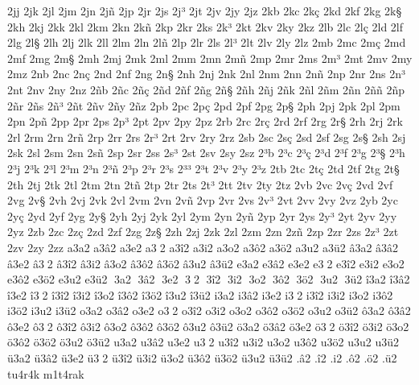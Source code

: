 {2jj
2jk
2jl
2jm
2jn
2j^^f1
2jp
2jr
2js
2j^^b3
2jt
2jv
2jy
2jz
2kb
2kc
2k^^e7
2kd
2kf
2kg
2k^^a7
2kh
2kj
2kk
2kl
2km
2kn
2k^^f1
2kp
2kr
2ks
2k^^b3
2kt
2kv
2ky
2kz
2lb
2lc
2l^^e7
2ld
2lf
2lg
2l^^a7
2lh
2lj
2lk
2ll
2lm
2ln
2l^^f1
2lp
2lr
2ls
2l^^b3
2lt
2lv
2ly
2lz
2mb
2mc
2m^^e7
2md
2mf
2mg
2m^^a7
2mh
2mj
2mk
2ml
2mm
2mn
2m^^f1
2mp
2mr
2ms
2m^^b3
2mt
2mv
2my
2mz
2nb
2nc
2n^^e7
2nd
2nf
2ng
2n^^a7
2nh
2nj
2nk
2nl
2nm
2nn
2n^^f1
2np
2nr
2ns
2n^^b3
2nt
2nv
2ny
2nz
2^^f1b
2^^f1c
2^^f1^^e7
2^^f1d
2^^f1f
2^^f1g
2^^f1^^a7
2^^f1h
2^^f1j
2^^f1k
2^^f1l
2^^f1m
2^^f1n
2^^f1^^f1
2^^f1p
2^^f1r
2^^f1s
2^^f1^^b3
2^^f1t
2^^f1v
2^^f1y
2^^f1z
2pb
2pc
2p^^e7
2pd
2pf
2pg
2p^^a7
2ph
2pj
2pk
2pl
2pm
2pn
2p^^f1
2pp
2pr
2ps
2p^^b3
2pt
2pv
2py
2pz
2rb
2rc
2r^^e7
2rd
2rf
2rg
2r^^a7
2rh
2rj
2rk
2rl
2rm
2rn
2r^^f1
2rp
2rr
2rs
2r^^b3
2rt
2rv
2ry
2rz
2sb
2sc
2s^^e7
2sd
2sf
2sg
2s^^a7
2sh
2sj
2sk
2sl
2sm
2sn
2s^^f1
2sp
2sr
2ss
2s^^b3
2st
2sv
2sy
2sz
2^^b3b
2^^b3c
2^^b3^^e7
2^^b3d
2^^b3f
2^^b3g
2^^b3^^a7
2^^b3h
2^^b3j
2^^b3k
2^^b3l
2^^b3m
2^^b3n
2^^b3^^f1
2^^b3p
2^^b3r
2^^b3s
2^^b3^^b3
2^^b3t
2^^b3v
2^^b3y
2^^b3z
2tb
2tc
2t^^e7
2td
2tf
2tg
2t^^a7
2th
2tj
2tk
2tl
2tm
2tn
2t^^f1
2tp
2tr
2ts
2t^^b3
2tt
2tv
2ty
2tz
2vb
2vc
2v^^e7
2vd
2vf
2vg
2v^^a7
2vh
2vj
2vk
2vl
2vm
2vn
2v^^f1
2vp
2vr
2vs
2v^^b3
2vt
2vv
2vy
2vz
2yb
2yc
2y^^e7
2yd
2yf
2yg
2y^^a7
2yh
2yj
2yk
2yl
2ym
2yn
2y^^f1
2yp
2yr
2ys
2y^^b3
2yt
2yv
2yy
2yz
2zb
2zc
2z^^e7
2zd
2zf
2zg
2z^^a7
2zh
2zj
2zk
2zl
2zm
2zn
2z^^f1
2zp
2zr
2zs
2z^^b3
2zt
2zv
2zy
2zz
a3a2
a3^^e22
a3e2
a3^^112
a3^^ee2
a3i2
a3o2
a3^^f42
a3^^f62
a3u2
a3^^fc2
^^e23a2
^^e23^^e22
^^e23e2
^^e23^^112
^^e23^^ee2
^^e23i2
^^e23o2
^^e23^^f42
^^e23^^f62
^^e23u2
^^e23^^fc2
e3a2
e3^^e22
e3e2
e3^^112
e3^^ee2
e3i2
e3o2
e3^^f42
e3^^f62
e3u2
e3^^fc2
^^113a2
^^113^^e22
^^113e2
^^113^^112
^^113^^ee2
^^113i2
^^113o2
^^113^^f42
^^113^^f62
^^113u2
^^113^^fc2
^^ee3a2
^^ee3^^e22
^^ee3e2
^^ee3^^112
^^ee3^^ee2
^^ee3i2
^^ee3o2
^^ee3^^f42
^^ee3^^f62
^^ee3u2
^^ee3^^fc2
i3a2
i3^^e22
i3e2
i3^^112
i3^^ee2
i3i2
i3o2
i3^^f42
i3^^f62
i3u2
i3^^fc2
o3a2
o3^^e22
o3e2
o3^^112
o3^^ee2
o3i2
o3o2
o3^^f42
o3^^f62
o3u2
o3^^fc2
^^f43a2
^^f43^^e22
^^f43e2
^^f43^^112
^^f43^^ee2
^^f43i2
^^f43o2
^^f43^^f42
^^f43^^f62
^^f43u2
^^f43^^fc2
^^f63a2
^^f63^^e22
^^f63e2
^^f63^^112
^^f63^^ee2
^^f63i2
^^f63o2
^^f63^^f42
^^f63^^f62
^^f63u2
^^f63^^fc2
u3a2
u3^^e22
u3e2
u3^^112
u3^^ee2
u3i2
u3o2
u3^^f42
u3^^f62
u3u2
u3^^fc2
^^fc3a2
^^fc3^^e22
^^fc3e2
^^fc3^^112
^^fc3^^ee2
^^fc3i2
^^fc3o2
^^fc3^^f42
^^fc3^^f62
^^fc3u2
^^fc3^^fc2
.^^e22
.^^ee2
.i2
.^^f42
.^^f62
.^^fc2
tu4r4k
m1t4rak
}
